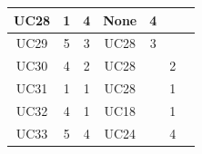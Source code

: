 \documentclass[12pt]{article}
\begin{document}
\begin{longtable}{|c|ccc|l|l|l|}
		UC28                 & \multicolumn{1}{c|}{1}               & \multicolumn{1}{c|}{4}                                                                         & None               & \multicolumn{1}{c|}{4}                                                                     &                                                                                               &                                                                                            \\ \hline
		UC29                 & \multicolumn{1}{c|}{5}               & \multicolumn{1}{c|}{3}                                                                         & UC28               & \multicolumn{1}{c|}{3}                                                                     &                                                                                               &                                                                                            \\ \hline
		UC30                 & \multicolumn{1}{c|}{4}               & \multicolumn{1}{c|}{2}                                                                         & UC28               &                                                                                            & \multicolumn{1}{c|}{2}                                                                        &                                                                                            \\ \hline
		UC31                 & \multicolumn{1}{c|}{1}               & \multicolumn{1}{c|}{1}                                                                         & UC28               &                                                                                            & \multicolumn{1}{c|}{1}                                                                        &                                                                                            \\ \hline
		UC32                 & \multicolumn{1}{c|}{4}               & \multicolumn{1}{c|}{1}                                                                         & UC18               &                                                                                            & \multicolumn{1}{c|}{1}                                                                        &                                                                                            \\ \hline
		UC33                 & \multicolumn{1}{c|}{5}               & \multicolumn{1}{c|}{4}                                                                         & UC24               &                                                                                            & \multicolumn{1}{c|}{4}                                                                        &                                                                                            \\ \hline

\end{longtable}
\end{document}
